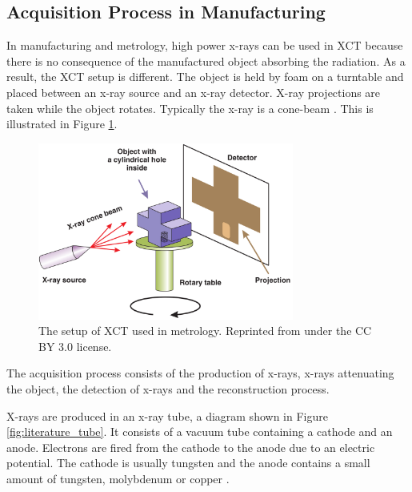 \subsection{Acquisition Process in Manufacturing}

In manufacturing and metrology, high power x-rays can be used in XCT because there is no consequence of the manufactured object absorbing the radiation. As a result, the XCT setup is different. The object is held by foam on a turntable and placed between an x-ray source and an x-ray detector. X-ray projections are taken while the object rotates. Typically the x-ray is a cone-beam \citep{kruth2011computed}. This is illustrated in Figure \ref{fig:literature_xct}.

\begin{figure}
  \centering
  \includegraphics[width=0.75\textwidth]{../figures/literatureReview/literature_xct.png}
  \caption{The setup of XCT used in metrology. Reprinted from \cite{warnett2016towards} under the CC BY 3.0 license.}
  \label{fig:literature_xct}
\end{figure}

The acquisition process consists of the production of x-rays, x-rays attenuating the object, the detection of x-rays and the reconstruction process.

X-rays \citep{rontgen1896on} are produced in an x-ray tube, a diagram shown in Figure \ref{fig:literature_tube}. It consists of a vacuum tube containing a cathode and an anode. Electrons are fired from the cathode to the anode due to an electric potential. The cathode is usually tungsten and the anode contains a small amount of tungsten, molybdenum or copper \citep{sun2012overview}.

